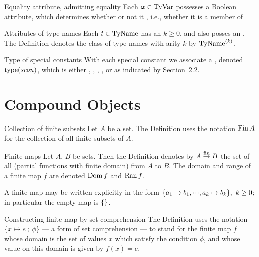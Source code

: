 \begin{definition}{Equality attribute, admitting equality}
Each $\alpha\in{\rm TyVar}$ possesses a Boolean  attribute,
which determines whether or not it , i.e.,
whether it is a member of \EtyVar{} 
\end{definition}

\begin{definition}{Attributes of type names}
Each $t\in{\rm TyName}$ has an  $k\geq0$, and also posses an
. The Definition denotes the class of type
names with arity $k$ by ${\rm TyName}^{(k)}$.
\end{definition}

\begin{definition}{Type of special constants}\index{$\scontype(\scon)$}
With each special constant {\scon} we associate a
, denoted $\scontype(\scon)$, which is either {\INT}, {\REAL},
{\WORD}, {\CHAR},  or {\STRING} as indicated by Section~2.2.
\end{definition}

\section{Compound Objects}\label{sec:static-core:compound-objects}

\begin{definition}{Collection of finite subsets}
Let $A$ be a set. The Definition uses the notation $\mathop{\rm Fin}\nolimits A$ for the
collection of all finite subsets of $A$.
\end{definition}

\begin{definition}{Finite maps}
Let $A$, $B$ be sets. Then the Definition denotes by $A\stackrel{{\rm fin}}{\to}B$ the
set of all  (partial functions with finite domain)
from $A$ to $B$. The domain and range of a finite map $f$ are denoted
$\mathop{\rm Dom}\nolimits f$ and $\mathop{\rm Ran}\nolimits f$.

A finite map may be written explicitly in the form $\{a_1\mapsto b_1,\mbox{$\cdot\!\cdot\!\cdot$},a_k\mapsto b_k\},
\ k\geq 0$;
in particular the empty map is $\{\}$.
\end{definition}

\begin{convention}{Constructing finite map by set comprehension}\label{convention:static-core:finite-map-by-set-comprehesion}
The Definition uses the notation $\{x\mapsto e\ ;\ \phi\}$ --- a form of
set comprehension --- to stand for the finite map $f$ whose domain is
the set of values $x$ which satisfy the condition $\phi$, and whose
value on this domain is given by $f(x)=e$.
\end{convention}

